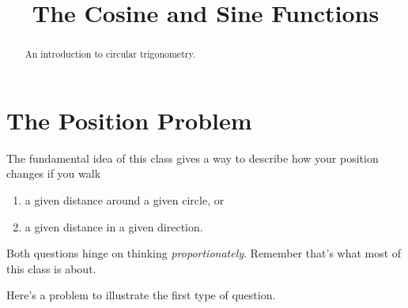 \documentclass{ximera}
\title{The Cosine and Sine Functions}
\begin{document}
\begin{abstract}
An introduction to circular trigonometry.
\end{abstract}
\maketitle


\section{The Position Problem}

The fundamental idea of this class gives a way to describe how your position changes if you walk

\begin{enumerate}
\item a given distance around a given circle, or

\item a given distance in a given direction. 
\end{enumerate}

Both questions hinge on thinking \emph{proportionately}. Remember that's what most of this class is about.
 
Here's a problem to illustrate the first type of question.
\end{document}
